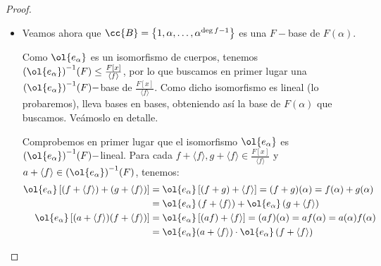\begin{prop}
\begin{proof}
\begin{itemize}
\begin{description}
                \item[$\subset$)] Para ver que $Im e_\alpha\subset F(\alpha)$, consideramos un elemento de la imagen de $e_\alpha$, que será de la forma $g(\alpha)$ para cierto $g\in F[x]$, que tendrá la forma:
                \begin{equation*}
                    g(x) = \sum\limits_{i=1}^{n} g_i x^i\qquad g_i \in F
                \end{equation*}
                de donde:
                \begin{equation*}
                    g(\alpha) = \sum\limits_{i=1}^{n} g_i \alpha^i
                \end{equation*}
                Con $g_i \in F$ y $\alpha \in F(\alpha)$, luego $g(\alpha) \in F(\alpha)$ por ser este un cuerpo.
            \end{description}

                En definitiva, concluimos que:
                \begin{equation*}
                    F(\alpha) = Im e_\alpha \cong \dfrac{F[x]}{\langle f \rangle }
                \end{equation*}
            \item Veamos ahora que $\cc{B}=\left\{1,\alpha,\ldots, \alpha^{\deg f-1}\right\}$ es una $F-$base de $F(\alpha)$.
            
            Como $\ol{e_\alpha}$ es un isomorfismo de cuerpos, tenemos ${(\ol{e_\alpha})}^{-1}(F)\leq \frac{F[x]}{\langle f \rangle }$, por lo que buscamos en primer lugar una ${(\ol{e_\alpha})}^{-1}(F)-$base de $\frac{F[x]}{\langle f \rangle }$. Como dicho isomorfismo es lineal (lo probaremos), lleva bases en bases, obteniendo así la base de $F(\alpha)$ que buscamos. Veámoslo en detalle.
            
            Comprobemos en primer lugar que el isomorfismo $\ol{e_\alpha}$ es ${(\ol{e_\alpha})}^{-1}(F)-$lineal. Para cada $f+\langle f \rangle , g+\langle f \rangle \in \frac{F[x]}{\langle f \rangle }$ y $a+\langle f \rangle \in {(\ol{e_\alpha})}^{-1}(F)$, tenemos:
                \begin{align*}
                    \ol{e_\alpha}\left[(f+\langle f \rangle ) + (g+\langle f \rangle )\right] &= \ol{e_\alpha}\left[(f+g)+\langle f \rangle \right] = (f+g)(\alpha) = f(\alpha) + g(\alpha)\\
                    &= \ol{e_\alpha}\left(f+\langle f \rangle \right) + \ol{e_\alpha}\left(g+\langle f \rangle \right)\\
                    \ol{e_\alpha}\left[(a+\langle f \rangle)(f+\langle f \rangle )\right] &= \ol{e_\alpha}\left[(af)+\langle f \rangle \right] = (af)(\alpha) = a f(\alpha) = a(\alpha)f(\alpha) \\
                    &= \ol{e_\alpha}(a+\langle f \rangle) \cdot \ol{e_\alpha}\left(f+\langle f \rangle \right)
                \end{align*}


\end{itemize}
\end{proof}
\end{prop}
